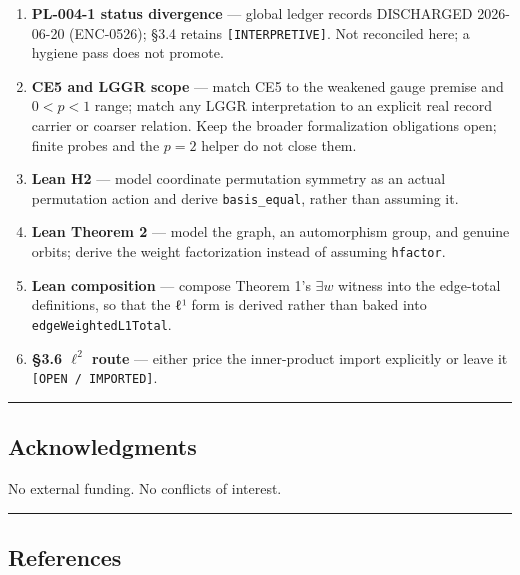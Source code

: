 \documentclass[
  11pt,
]{article}
\providecommand{\tightlist}{%
  \setlength{\itemsep}{0pt}\setlength{\parskip}{0pt}}
\providecommand{\tightlist}{%
  \setlength{\itemsep}{0pt}\setlength{\parskip}{0pt}}
\begin{document}
\begin{enumerate}
\def\labelenumi{\arabic{enumi}.}
\tightlist
\item
  \textbf{PL-004-1 status divergence} --- global ledger records
  DISCHARGED 2026-06-20 (ENC-0526); §3.4 retains
  \texttt{[INTERPRETIVE]}. Not reconciled here; a hygiene pass does not
  promote.
\item
  \textbf{CE5 and LGGR scope} --- match CE5 to the weakened gauge
  premise and \(0<p<1\) range; match any LGGR interpretation to an
  explicit real record carrier or coarser relation. Keep the broader
  formalization obligations open; finite probes and the \(p=2\) helper
  do not close them.
\item
  \textbf{Lean H2} --- model coordinate permutation symmetry as an
  actual permutation action and derive
  \texttt{basis\_\allowbreak{}equal}, rather than assuming it.
\item
  \textbf{Lean Theorem 2} --- model the graph, an automorphism group,
  and genuine orbits; derive the weight factorization instead of
  assuming \texttt{hfactor}.
\item
  \textbf{Lean composition} --- compose Theorem 1's \(\exists w\)
  witness into the edge-total definitions, so that the ℓ¹ form is
  derived rather than baked into \texttt{edgeWeightedL1Total}.
\item
  \textbf{§3.6 \(\ell^2\) route} --- either price the inner-product
  import explicitly or leave it \texttt{[OPEN /\allowbreak{} IMPORTED]}.
\end{enumerate}

\begin{center}\rule{0.5\linewidth}{0.5pt}\end{center}

\hypertarget{acknowledgments}{%
\subsection{Acknowledgments}\label{acknowledgments}}

No external funding. No conflicts of interest.

\begin{center}\rule{0.5\linewidth}{0.5pt}\end{center}

\hypertarget{references}{%
\subsection{References}\label{references}}
\end{document}
